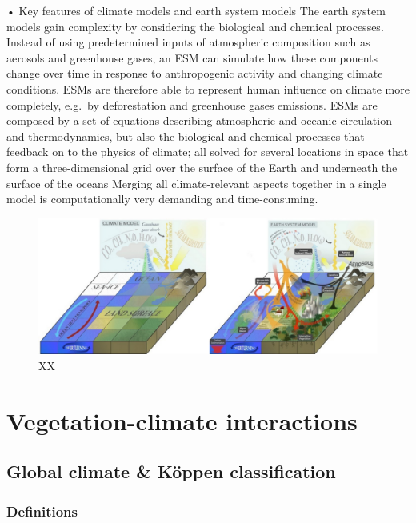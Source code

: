 \documentclass[12pt,oneside]{book}
\begin{document}
• Key features of climate models and earth system models The earth
system models gain complexity by considering the biological and chemical
processes. Instead of using predetermined inputs of atmospheric
composition such as aerosols and greenhouse gases, an ESM can simulate
how these components change over time in response to anthropogenic
activity and changing climate conditions. ESMs are therefore able to
represent human influence on climate more completely, e.g.~by
deforestation and greenhouse gases emissions. ESMs are composed by a set
of equations describing atmospheric and oceanic circulation and
thermodynamics, but also the biological and chemical processes that
feedback on to the physics of climate; all solved for several locations
in space that form a three-dimensional grid over the surface of the
Earth and underneath the surface of the oceans Merging all
climate-relevant aspects together in a single model is computationally
very demanding and time-consuming.

\begin{figure}

{\centering \includegraphics[width=0.8\linewidth]{figures/Figure714} 

}

\caption{XX}\label{fig:Earthsystemmodels3}
\end{figure}

\part{Vegetation-climate
interactions}\label{part-vegetation-climate-interactions}

\chapter{Global climate \& Köppen classification}\label{introKopen}


\section{Definitions}\label{definitions-1}
\end{document}
